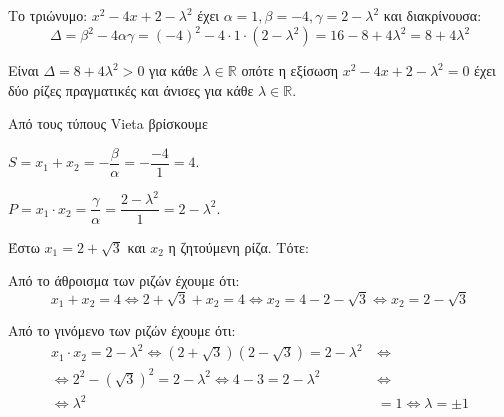 
\begin{alist}
\item Το τριώνυμο: $x^2 - 4x + 2 - \lambda^2$ έχει $\alpha = 1, \beta = -4, \gamma = 2 - \lambda^2$ και διακρίνουσα:
\[\Delta = \beta^2 - 4\alpha\gamma = (-4)^2 - 4 \cdot 1 \cdot (2 - \lambda^2) = 16 - 8 + 4\lambda^2 = 8 + 4\lambda^2\]

Είναι $\Delta = 8 + 4\lambda^2 > 0$ για κάθε $\lambda \in \mathbb{R}$ οπότε η εξίσωση $x^2 - 4x + 2 - \lambda^2 = 0$ έχει δύο ρίζες πραγματικές και άνισες για κάθε $\lambda \in \mathbb{R}$.

\item Από τους τύπους Vieta βρίσκουμε
\begin{rlist}
\item $S = x_1 + x_2 = -\dfrac{\beta}{\alpha} = -\dfrac{-4}{1} = 4$.
\item $P = x_1 \cdot x_2 = \dfrac{\gamma}{\alpha} = \dfrac{2 - \lambda^2}{1} = 2 - \lambda^2$.
\end{rlist}

\item Έστω $x_1 = 2 + \sqrt{3}$ και $x_2$ η ζητούμενη ρίζα. Τότε:
\begin{rlist}
\item Από το άθροισμα των ριζών έχουμε ότι:
\[x_1 + x_2 = 4 \Leftrightarrow 2 + \sqrt{3} + x_2 = 4 \Leftrightarrow x_2 = 4 - 2 - \sqrt{3} \Leftrightarrow x_2 = 2 - \sqrt{3}\]
\item Από το γινόμενο των ριζών έχουμε ότι:
\begin{align*}
x_1 \cdot x_2 = 2 - \lambda^2 \Leftrightarrow (2 + \sqrt{3})(2 - \sqrt{3}) = 2 - \lambda^2 \ &\Leftrightarrow \\
\Leftrightarrow 2^2 - (\sqrt{3})^2 = 2 - \lambda^2 \Leftrightarrow 4 - 3 = 2 - \lambda^2 \ &\Leftrightarrow \\
\Leftrightarrow \lambda^2 &= 1 \Leftrightarrow \lambda = \pm 1
\end{align*}
\end{rlist}
\end{alist}

